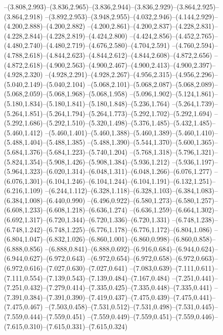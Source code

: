   --(3.808,2.993)--(3.836,2.965)--(3.836,2.944)--(3.836,2.929)--(3.864,2.925)--(3.864,2.918)%
  --(3.892,2.953)--(3.948,2.955)--(4.032,2.946)--(4.144,2.929)--(4.200,2.888)--(4.200,2.882)%
  --(4.200,2.861)--(4.200,2.837)--(4.228,2.831)--(4.228,2.844)--(4.228,2.819)--(4.424,2.800)%
  --(4.424,2.856)--(4.452,2.765)--(4.480,2.740)--(4.480,2.719)--(4.676,2.580)--(4.704,2.591)%
  --(4.760,2.594)--(4.788,2.618)--(4.844,2.623)--(4.844,2.612)--(4.844,2.608)--(4.872,2.656)%
  --(4.872,2.618)--(4.900,2.563)--(4.900,2.467)--(4.900,2.413)--(4.900,2.397)--(4.928,2.320)%
  --(4.928,2.291)--(4.928,2.267)--(4.956,2.315)--(4.956,2.296)--(5.040,2.149)--(5.040,2.104)%
  --(5.068,2.101)--(5.068,2.087)--(5.068,2.089)--(5.068,2.059)--(5.068,1.968)--(5.068,1.958)%
  --(5.096,1.902)--(5.124,1.861)--(5.180,1.834)--(5.180,1.841)--(5.180,1.848)--(5.236,1.764)%
  --(5.264,1.739)--(5.264,1.851)--(5.264,1.794)--(5.264,1.773)--(5.292,1.702)--(5.292,1.694)%
  --(5.292,1.686)--(5.292,1.510)--(5.320,1.498)--(5.376,1.485)--(5.432,1.485)--(5.460,1.412)%
  --(5.460,1.401)--(5.460,1.388)--(5.460,1.389)--(5.460,1.410)--(5.488,1.404)--(5.488,1.385)%
  --(5.488,1.390)--(5.544,1.370)--(5.600,1.365)--(5.684,1.376)--(5.684,1.223)--(5.740,1.204)%
  --(5.768,1.318)--(5.796,1.321)--(5.824,1.354)--(5.908,1.426)--(5.908,1.384)--(5.936,1.212)%
  --(5.936,1.197)--(5.964,1.323)--(6.020,1.314)--(6.048,1.311)--(6.048,1.266)--(6.076,1.277)%
  --(6.076,1.301)--(6.104,1.246)--(6.104,1.244)--(6.104,1.191)--(6.132,1.251)--(6.216,1.109)%
  --(6.244,1.112)--(6.328,1.118)--(6.328,1.103)--(6.384,1.083)--(6.384,1.008)--(6.440,0.990)%
  --(6.496,0.922)--(6.580,1.273)--(6.580,1.257)--(6.608,1.233)--(6.608,1.218)--(6.636,1.274)%
  --(6.636,1.259)--(6.664,1.302)--(6.692,1.317)--(6.720,1.344)--(6.720,1.336)--(6.720,1.331)%
  --(6.748,1.238)--(6.748,1.242)--(6.748,1.225)--(6.776,1.178)--(6.776,1.172)--(6.804,1.086)%
  --(6.804,1.047)--(6.832,1.026)--(6.860,1.001)--(6.860,0.998)--(6.860,0.858)--(6.888,0.856)%
  --(6.888,0.841)--(6.888,0.692)--(6.916,0.684)--(6.944,0.624)--(6.944,0.627)--(6.972,0.643)%
  --(6.972,0.654)--(6.972,0.658)--(6.972,0.663)--(6.972,0.616)--(7.027,0.630)--(7.027,0.641)%
  --(7.083,0.639)--(7.111,0.611)--(7.111,0.554)--(7.139,0.543)--(7.139,0.484)--(7.167,0.484)%
  --(7.251,0.441)--(7.251,0.432)--(7.279,0.414)--(7.335,0.425)--(7.335,0.448)--(7.335,0.441)%
  --(7.391,0.384)--(7.391,0.390)--(7.419,0.437)--(7.475,0.439)--(7.475,0.441)--(7.475,0.467)%
  --(7.503,0.458)--(7.531,0.512)--(7.531,0.498)--(7.531,0.445)--(7.559,0.444)--(7.559,0.451)%
  --(7.559,0.449)--(7.559,0.451)--(7.559,0.446)--(7.615,0.310)--(7.615,0.331)--(7.615,0.324)%
